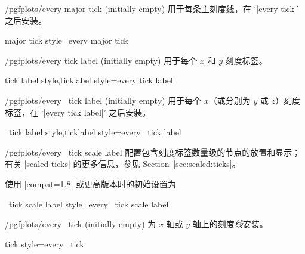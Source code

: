 \begin{stylekey}{/pgfplots/every major tick (initially empty)}
    用于每条主刻度线，在 `|every tick|' 之后安装。
\end{stylekey}

\pgfplotsshortstylekey major tick style=every major tick\pgfeov

\begin{stylekey}{/pgfplots/every tick label (initially empty)}
    用于每个 $x$ 和 $y$ 刻度标签。
\end{stylekey}

\pgfplotsshortxystylekeys tick label style,ticklabel style=every tick label\pgfeov

\begin{xystylekey}{/pgfplots/every \x\ tick label (initially empty)}
    用于每个 $x$（或分别为 $y$ 或 $z$）刻度标签，在 `|every tick label|' 之后安装。
\end{xystylekey}

\pgfplotsshortxystylekeys \x\ tick label style,\x ticklabel style=every \x\ tick label\pgfeov

\begin{xystylekey}{/pgfplots/every \x\ tick scale label}
    配置包含刻度标签数量级的节点的放置和显示；有关 |scaled ticks| 的更多信息，参见 Section~\ref{sec:scaled:ticks}。

    使用 |compat=1.8| 或更高版本时的初始设置为
\begin{codeexample}
\end{codeexample}
\end{xystylekey}

\pgfplotsshortxystylekey \x\ tick scale label style=every \x\ tick scale label\pgfeov

\begin{xystylekey}{/pgfplots/every \x\ tick (initially empty)}
    为 $x$ 轴或 $y$ 轴上的刻度\emph{线}安装。
\end{xystylekey}

\pgfplotsshortxystylekey \x tick style=every \x\ tick\pgfeov

